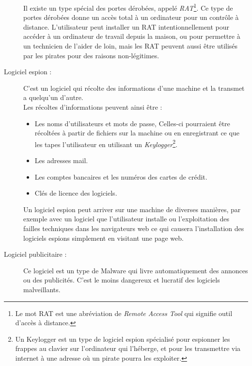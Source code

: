 \begin{description}
            Il existe un type spécial des portes dérobées, appelé \emph{RAT}\footnote{Le mot RAT est une
            abréviation de \emph{Remote Access Tool} qui signifie outil d'accès à distance.}. Ce type de portes
            dérobées donne un accès total à un ordinateur pour un contrôle à distance. L'utilisateur peut
            installer un RAT intentionnellement pour accéder à un ordinateur de travail depuis la maison, ou pour 
            permettre à un technicien de l'aider de loin, mais les RAT peuvent aussi être utilisés par les 
            pirates pour des raisons non-légitimes. \cite{virus} %

        \item[Logiciel espion :] C'est un logiciel qui récolte des informations d’une machine et 
            la transmet a quelqu'un d'autre.\\ %
            Les récoltes d'informations peuvent ainsi être :
            \begin{itemize}
                \item Les noms d’utilisateurs et mots de passe, Celles-ci pourraient être récoltées à partir de
                    fichiers sur la machine ou en enregistrant ce que les tapes l'utilisateur en utilisant 
                    un \emph{Keylogger}\footnote{Un Keylogger est un type de logiciel espion spécialisé pour 
                    espionner les frappes au clavier sur l'ordinateur qui l'héberge, et pour les transmettre 
                    via internet à une adresse où un pirate pourra les exploiter.}.
                \item Les adresses mail.
                \item Les comptes bancaires et les numéros des cartes de crédit.
                \item Clés de licence des logiciels.
            \end{itemize} %
            Un logiciel espion peut arriver sur une machine de diverses manières, par exemple avec un logiciel 
            que l’utilisateur installe ou l’exploitation des failles techniques dans les navigateurs web ce 
            qui causera l’installation des logiciels espions simplement en visitant une page web.\cite{virus}%

        \item[Logiciel publicitaire :] Ce logiciel est un type de Malware qui livre automatiquement des 
            annonces ou des publicités. C’est le moins dangereux et lucratif des logiciels malveillants. %


\end{description}
